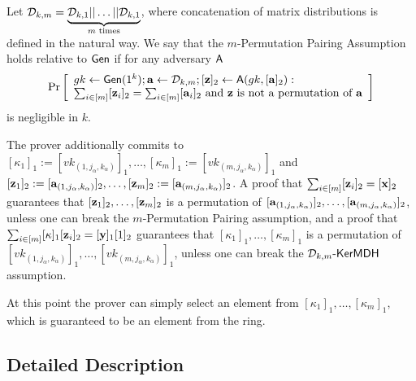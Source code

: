 \begin{definition}
Let $\mathcal{D}_{k,m}=\underbrace{\mathcal{D}_{k,1}||\ldots||\mathcal{D}_{k,1}}_{m\text{ times}}$, where concatenation of matrix distributions is defined in the natural way. We say that the $m$-Permutation Pairing Assumption holds relative to $\mathsf{Gen}$ if for any adversary $\mathsf{A}$
$$
\Pr\left[
\begin{array}{l}
gk\gets\mathsf{Gen}(1^k);\mathbf{a}\gets\mathcal{D}_{k,m};[\mathbf{z}]_2\gets\mathsf{A}(gk,[\mathbf{a}]_2):\\
\sum_{i\in[m]}[\mathbf{z}_i]_2=\sum_{i\in[m]}[\mathbf{a}_i]_2\text{ and }
\mathbf{z}\text{ is not a permutation of }\mathbf{a}
\end{array}
\right]
$$
is negligible in $k$.
\end{definition}

The prover additionally commits to $[\kappa_1]_1:=[vk_{(1,j_\alpha,k_\alpha)}]_1,\ldots,[\kappa_m]_1:=[vk_{(m,j_\alpha,k_\alpha)}]_1$ and $[\mathbf{z}_1]_2:=[\mathbf{a}_{(1,j_\alpha,k_\alpha)}]_2,\ldots,[\mathbf{z}_m]_2:=[\mathbf{a}_{(m,j_\alpha,k_\alpha)}]_2$. A proof that $\sum_{i\in[m]}[\mathbf{z}_i]_2=[\mathbf{x}]_2$ guarantees that $[\mathbf{z}_1]_2,\ldots,[\mathbf{z}_m]_2$ is a permutation of $[\mathbf{a}_{(1,j_\alpha,k_\alpha)}]_2,\ldots,[\mathbf{a}_{(m,j_\alpha,k_\alpha)}]_2$, unless one can break the $m$-Permutation Pairing assumption, and a proof that $\sum_{i\in[m]}[\kappa]_1[\mathbf{z}_i]_2=[\mathbf{y}]_1[1]_2$ guarantees that $[\kappa_1]_1,\ldots,[\kappa_m]_1$ is a permutation of $[vk_{(1,j_\alpha,k_\alpha)}]_1,\ldots,[vk_{(m,j_\alpha,k_\alpha)}]_1$, unless one can break the $\mathcal{D}_{k,m}\mbox{-}\mathsf{KerMDH}$ assumption.

At this point the prover can simply select an element from $[\kappa_1]_1,\ldots,[\kappa_m]_1$, which is guaranteed to be an element from the ring.

\subsection{Detailed Description}
